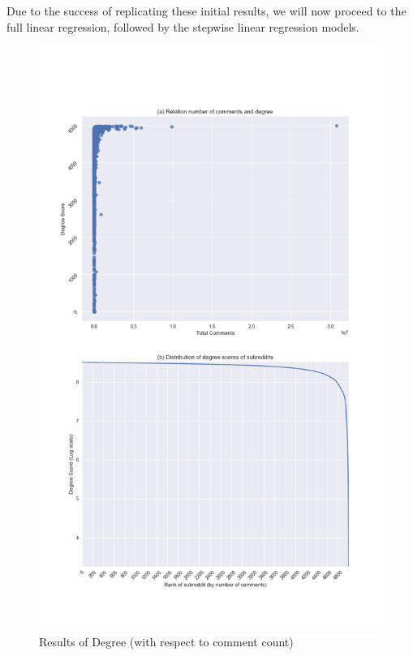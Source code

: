 \documentclass[bsc,frontabs,twoside,singlespacing,parskip,deptreport]{infthesis}
\begin{document}
Due to the success of replicating these initial results, we will now proceed to the full linear regression, followed by the stepwise linear regression models. 

\begin{figure}[p]
	\centering
  	\includegraphics[width=\textwidth]{degree.png}
  	\caption{Results of Degree (with respect to comment count)}
  	\label{fig:degree}
\end{figure}
\end{document}
